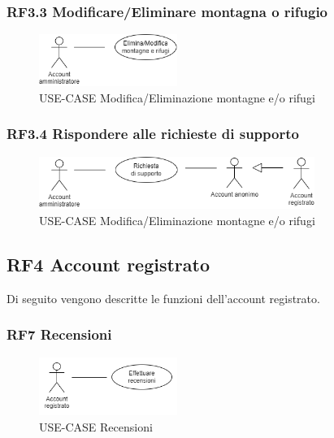 \documentclass[a4paper,12pt]{article}
\begin{document}
\subsubsection{RF3.3 Modificare/Eliminare montagna o rifugio}
\begin{figure}[H]
   \centering
   \includegraphics[width=0.4\textwidth]{img-D2/m_e_montagna_rifugio.png}
    \caption{USE-CASE Modifica/Eliminazione montagne e/o rifugi}
\end{figure}

\subsubsection{RF3.4 Rispondere alle richieste di supporto}

\begin{figure}[H]
   \centering
   \includegraphics[width=0.8\textwidth]{img-D2/richiesta_supporto_amministratore.png}
    \caption{USE-CASE Modifica/Eliminazione montagne e/o rifugi}
\end{figure}




\subsection*{RF4 Account registrato}

Di seguito vengono descritte le funzioni dell'account registrato.

\subsubsection*{RF7 Recensioni}
\begin{figure}[H]
   \centering
   \includegraphics[width=0.4\textwidth]{img-D2/recensioni_registrato.png}
    \caption{USE-CASE Recensioni}
\end{figure}
 
\end{document}
